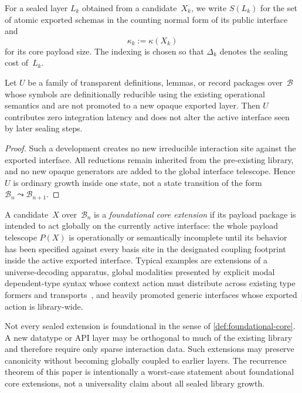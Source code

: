 \documentclass{lmcs}
\newcommand{\B}{\mathcal{B}}
\begin{document}
For a sealed layer $L_k$ obtained from a candidate~$X_k$, we write $S(L_k)$ for the set of atomic exported schemas in the counting normal form of its public interface and
\[
  \kappa_k := \kappa(X_k)
\]
for its core payload size. The indexing is chosen so that $\Delta_k$ denotes the sealing cost of~$L_k$.

\begin{prop}
\label{prop:transparent}
Let $U$ be a family of transparent definitions, lemmas, or record packages over~$\B$ whose symbols are definitionally reducible using the existing operational semantics and are not promoted to a new opaque exported layer. Then $U$ contributes zero integration latency and does not alter the active interface seen by later sealing steps.
\end{prop}

\begin{proof}
Such a development creates no new irreducible interaction site against the exported interface. All reductions remain inherited from the pre-existing library, and no new opaque generators are added to the global interface telescope. Hence $U$ is ordinary growth inside one state, not a state transition of the form $\B_n \leadsto \B_{n+1}$.
\end{proof}

\begin{defi}
\label{def:foundational-core}
A candidate~$X$ over~$\B_n$ is a \emph{foundational core extension} if its payload package is intended to act globally on the currently active interface: the whole payload telescope $P(X)$ is operationally or semantically incomplete until its behavior has been specified against every basis site in the designated coupling footprint inside the active exported interface. Typical examples are extensions of a universe-decoding apparatus, global modalities presented by explicit modal dependent-type syntax whose context action must distribute across existing type formers and transports~\cite{birkedal-modal-dtt,aagaard-cubical-mtt}, and heavily promoted generic interfaces whose exported action is library-wide.
\end{defi}

\begin{rem}
\label{rem:orthogonal}
Not every sealed extension is foundational in the sense of \autoref{def:foundational-core}. A new datatype or API layer may be orthogonal to much of the existing library and therefore require only sparse interaction data. Such extensions may preserve canonicity without becoming globally coupled to earlier layers. The recurrence theorem of this paper is intentionally a worst-case statement about foundational core extensions, not a universality claim about all sealed library growth.
\end{rem}
\end{document}
